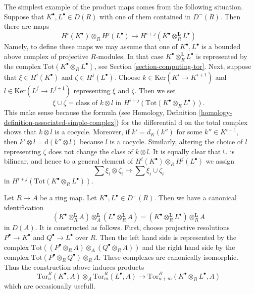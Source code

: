 \noindent
The simplest example of the product maps comes from the following situation.
Suppose that $K^\bullet, L^\bullet \in D(R)$ with one of them contained
in $D^{-}(R)$. Then there are maps
\begin{equation}
\label{equation-simple-tor-product}
H^i(K^\bullet) \otimes_R H^j(L^\bullet)
\longrightarrow
H^{i + j}(K^\bullet \otimes_R^{\mathbf{L}} L^\bullet)
\end{equation}
Namely, to define these maps we may assume that one of $K^\bullet, L^\bullet$
is a bounded above complex of projective $R$-modules. In that case
$K^\bullet \otimes_R^{\mathbf{L}} L^\bullet$ is represented by the
complex $\text{Tot}(K^\bullet \otimes_R L^\bullet)$, see
Section \ref{section-computing-tor}.
Next, suppose that $\xi \in H^i(K^\bullet)$ and $\zeta \in H^j(L^\bullet)$.
Choose $k \in \text{Ker}(K^i \to K^{i + 1})$ and
$l \in \text{Ker}(L^j \to L^{j + 1})$ representing $\xi$ and $\zeta$.
Then we set
$$
\xi \cup \zeta =
\text{class of }k \otimes l\text{ in }
H^{i + j}(\text{Tot}(K^\bullet \otimes_R L^\bullet)).
$$
This make sense because the formula (see
Homology, Definition \ref{homology-definition-associated-simple-complex})
for the differential $\text{d}$ on the total complex shows that
$k \otimes l$ is a cocycle. Moreover, if $k' = d_K(k'')$ for some
$k'' \in K^{i - 1}$, then $k' \otimes l = \text{d}(k'' \otimes l)$
because $l$ is a cocycle. Similarly, altering the choice of $l$
representing $\zeta$ does not change the class of $k \otimes l$.
It is equally clear that $\cup$ is bilinear, and hence
to a general element of $H^i(K^\bullet) \otimes_R H^j(L^\bullet)$
we assign
$$
\sum \xi_i \otimes \zeta_i \longmapsto \sum \xi_i \cup \zeta_i
$$
in $H^{i + j}(\text{Tot}(K^\bullet \otimes_R L^\bullet))$.

\medskip\noindent
Let $R \to A$ be a ring map. Let $K^\bullet, L^\bullet \in D^{-}(R)$.
Then we have a canonical identification
\begin{equation}
\label{equation-pullback-derived-tensor-product}
(K^\bullet \otimes_R^{\mathbf{L}} A)
\otimes_A^{\mathbf{L}}
(L^\bullet \otimes_R^{\mathbf{L}} A)
=
(K^\bullet \otimes_R^{\mathbf{L}} L^\bullet) \otimes_R^{\mathbf{L}} A
\end{equation}
in $D(A)$. It is constructed as follows. First, choose projective resolutions
$P^\bullet \to K^\bullet$ and $Q^\bullet \to L^\bullet$
over $R$. Then the left hand side is represented by the complex
$\text{Tot}((P^\bullet \otimes_R A) \otimes_A (Q^\bullet \otimes_R A))$
and the right hand side by the complex
$\text{Tot}(P^\bullet \otimes_R Q^\bullet) \otimes_R A$. These
complexes are canonically isomorphic. Thus the construction above
induces products
$$
\text{Tor}^R_n(K^\bullet, A) \otimes_A \text{Tor}^R_m(L^\bullet, A)
\longrightarrow \text{Tor}_{n + m}^R(K^\bullet \otimes_R L^\bullet, A)
$$
which are occasionally usefull.

